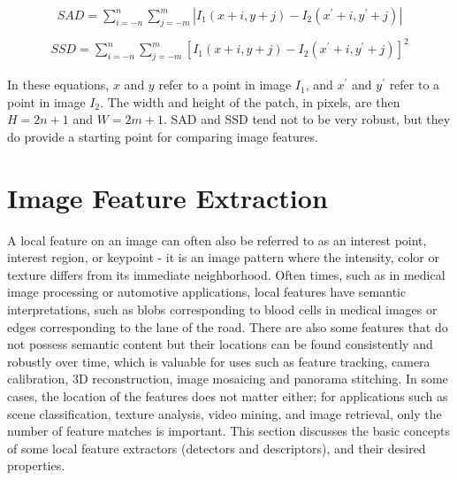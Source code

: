 \documentclass[twoside]{article}
\begin{document}
\begin{equation}
  \label{SAD}
  \begin{aligned}
    SAD = \sum_{i=-n}^n \sum_{j=-m}^m |I_1(x+i,y+j)-I_2(x^\prime+i,y^\prime+j)|\\
  \end{aligned}
\end{equation}
\begin{equation}
  \label{SSD}
  \begin{aligned}
  SSD = \sum_{i=-n}^n \sum_{j=-m}^m [I_1(x+i,y+j)-I_2(x^\prime+i,y^\prime+j)]^2
  \end{aligned}
\end{equation}

In these equations, $x$ and $y$ refer to a point in image $I_1$, and $x^\prime$ and $y^\prime$ refer to a point in image $I_2$.
The width and height of the patch, in pixels, are then $H = 2n+1$ and $W = 2m+1$. SAD and SSD tend not to be very robust, but they do provide a starting point for comparing image features.






\section{Image Feature Extraction}

A local feature on an image can often also be referred to as an interest point, interest region, or keypoint - it is an image pattern where the intensity, color or texture differs from its immediate neighborhood. Often times, such as in medical image processing or automotive applications, local features have semantic interpretations, such as blobs corresponding to blood cells in medical images or edges corresponding to the lane of the road. There are also some features that do not possess semantic content but their locations can be found consistently and robustly over time, which is valuable for uses such as feature tracking, camera calibration, 3D reconstruction, image mosaicing and panorama stitching. In some cases, the location of the features does not matter either; for applications such as scene classification, texture analysis, video mining, and image retrieval, only the number of feature matches is important. This section discusses the basic concepts of some local feature extractors (detectors and descriptors), and their desired properties.
\end{document}
